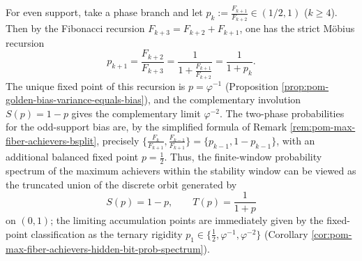 \begin{remark}\label{rem:pom-max-fiber-prob-spectrum-mobius-closure}
For even support, take a phase branch and let
\(
p_k:=\frac{F_{k+1}}{F_{k+2}}\in(1/2,1)
\) (\(k\ge 4\)).
Then by the Fibonacci recursion \(F_{k+3}=F_{k+2}+F_{k+1}\), one has the strict M\"obius recursion
\[
\boxed{\;
p_{k+1}=\frac{F_{k+2}}{F_{k+3}}=\frac{1}{1+\frac{F_{k+1}}{F_{k+2}}}=\frac{1}{1+p_k}.\;}
\]
The unique fixed point of this recursion is \(p=\varphi^{-1}\) (Proposition \ref{prop:pom-golden-bias-variance-equals-bias}), and the complementary involution \(S(p)=1-p\) gives the complementary limit \(\varphi^{-2}\).
The two-phase probabilities for the odd-support bias are, by the simplified formula of Remark \ref{rem:pom-max-fiber-achievers-bsplit}, precisely
\(
\{\frac{F_k}{F_{k+1}},\frac{F_{k-1}}{F_{k+1}}\}=\{p_{k-1},1-p_{k-1}\}
\),
with an additional balanced fixed point \(p=\tfrac12\).
Thus, the finite-window probability spectrum of the maximum achievers within the stability window can be viewed as the truncated union of the discrete orbit generated by
\[
S(p)=1-p,\qquad T(p)=\frac{1}{1+p}
\]
on \((0,1)\); the limiting accumulation points are immediately given by the fixed-point classification as the ternary rigidity
\(
p_1\in\{\tfrac12,\varphi^{-1},\varphi^{-2}\}
\)
(Corollary \ref{cor:pom-max-fiber-achievers-hidden-bit-prob-spectrum}).
\end{remark}

\endinput
